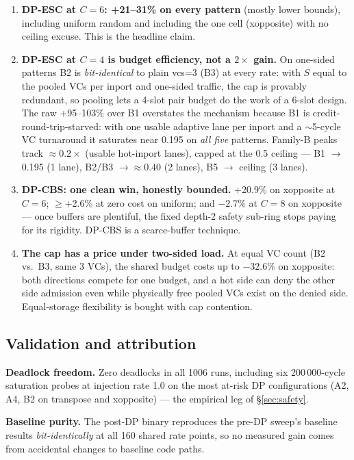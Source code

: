 \documentclass[10pt]{article}
\begin{document}
\begin{enumerate}
  \item \textbf{DP-ESC at $C{=}6$: +21--31\% on every pattern} (mostly
    lower bounds), including uniform random and including the one cell
    (xopposite) with no ceiling excuse. This is the headline claim.
  \item \textbf{DP-ESC at $C{=}4$ is budget efficiency, not a $2\times$
    gain.} On one-sided patterns B2 is \emph{bit-identical} to plain
    vcs=3 (B3) at every rate: with $S$ equal to the pooled VCs per inport
    and one-sided traffic, the cap is provably redundant, so pooling lets
    a 4-slot pair budget do the work of a 6-slot design. The raw
    +95--103\% over B1 overstates the mechanism because B1 is
    credit-round-trip-starved: with one usable adaptive lane per inport
    and a $\sim$5-cycle VC turnaround it saturates near 0.195 on
    \emph{all five} patterns. Family-B peaks track
    $\approx 0.2 \times$ (usable hot-inport lanes), capped at the 0.5
    ceiling --- B1 $\to$ 0.195 (1 lane), B2/B3 $\to \approx$0.40
    (2 lanes), B5 $\to$ ceiling (3 lanes).
  \item \textbf{DP-CBS: one clean win, honestly bounded.} +20.9\% on
    xopposite at $C{=}6$; $\ge$+2.6\% at zero cost on uniform; and
    \textbf{$-2.7\%$} at $C{=}8$ on xopposite --- once buffers are
    plentiful, the fixed depth-2 safety sub-ring stops paying for its
    rigidity. DP-CBS is a scarce-buffer technique.
  \item \textbf{The cap has a price under two-sided load.} At equal VC
    count (B2 vs.\ B3, same 3 VCs), the shared budget costs up to
    $-32.6\%$ on xopposite: both directions compete for one budget, and a
    hot side can deny the other side admission even while physically free
    pooled VCs exist on the denied side. Equal-storage flexibility is
    bought with cap contention.
\end{enumerate}

\subsection{Validation and attribution}
\label{sec:validation}

\textbf{Deadlock freedom.} Zero deadlocks in all 1006 runs, including six
200\,000-cycle saturation probes at injection rate 1.0 on the most
at-risk DP configurations (A2, A4, B2 on transpose and xopposite) ---
the empirical leg of \S\ref{sec:safety}.

\textbf{Baseline purity.} The post-DP binary reproduces the pre-DP
sweep's baseline results \emph{bit-identically} at all 160 shared rate
points, so no measured gain comes from accidental changes to baseline
code paths.
\end{document}
